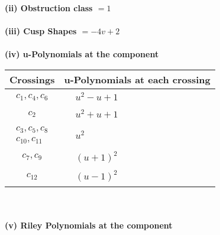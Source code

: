 \documentclass[1p]{elsarticle_modified}
\theoremstyle{definition}
\begin{document}
\flushleft \textbf{(ii) Obstruction class $= 1$}\\~\\
\flushleft \textbf{(iii) Cusp Shapes $= -4 v+2$}\\~\\
\newpage\renewcommand{\arraystretch}{1}
\flushleft \textbf{(iv) u-Polynomials at the component}\newline \\
\begin{tabular}{m{50pt}|m{274pt}}
Crossings & \hspace{64pt}u-Polynomials at each crossing \\
\hline $$\begin{aligned}c_{1},c_{4},c_{6}\end{aligned}$$&$\begin{aligned}
&u^2- u+1
\end{aligned}$\\
\hline $$\begin{aligned}c_{2}\end{aligned}$$&$\begin{aligned}
&u^2+u+1
\end{aligned}$\\
\hline $$\begin{aligned}c_{3},c_{5},c_{8}\\c_{10},c_{11}\end{aligned}$$&$\begin{aligned}
&u^2
\end{aligned}$\\
\hline $$\begin{aligned}c_{7},c_{9}\end{aligned}$$&$\begin{aligned}
&(u+1)^2
\end{aligned}$\\
\hline $$\begin{aligned}c_{12}\end{aligned}$$&$\begin{aligned}
&(u-1)^2
\end{aligned}$\\
\hline
\end{tabular}\\~\\
\newpage\renewcommand{\arraystretch}{1}
\flushleft \textbf{(v) Riley Polynomials at the component}\newline \\
\end{document}
